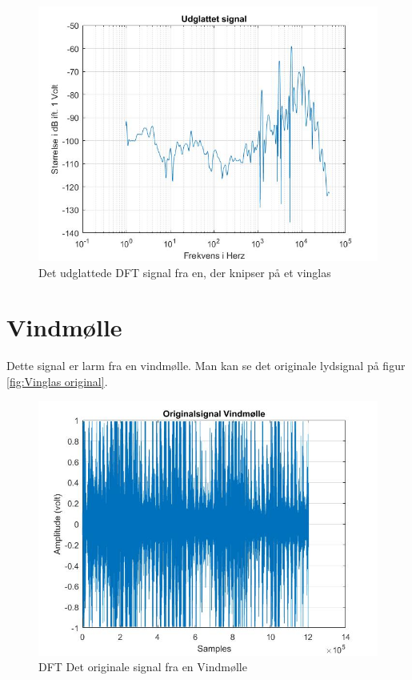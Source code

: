 \begin{figure}[H]
	\centering
	\includegraphics[width=120mm]{figures/Vinglas/udglattet.jpg}
	\caption{Det udglattede DFT signal fra en, der knipser på et vinglas}
	\label{fig:Vinglas udglattet}
\end{figure}



\section{Vindmølle}
Dette signal er larm fra en vindmølle. Man kan se det originale lydsignal på figur \ref{fig:Vinglas original}.
\begin{figure}[H]
	\centering
	\includegraphics[width=140mm]{figures/Vind/original.jpg}
	\caption{DFT Det originale signal fra en Vindmølle}
	\label{fig:Vind original}
\end{figure}

